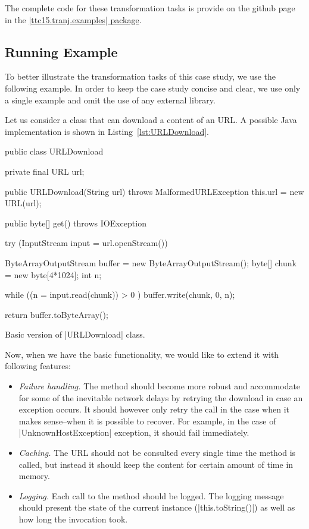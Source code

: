 The complete code for these transformation tasks is provide on the github page in the \href{https://github.com/fikovnik/ttc15-tranj-case/tree/master/src/ttc15-tranj/src/main/java/ttc15/tranj/examples}{\javainline|ttc15.tranj.examples| package}.

\subsection{Running Example}

To better illustrate the transformation tasks of this case study, we use the following example.
In order to keep the case study concise and clear, we use only a single example and omit the use of any external library.

Let us consider a class that can download a content of an URL.
A possible Java implementation is shown in Listing~\ref{lst:URLDownload}.

\begin{listing}[H]
  \begin{javacode}
  public class URLDownload {
    private final URL url;

    public URLDownload(String url) throws MalformedURLException {
      this.url = new URL(url);
    }

    public byte[] get() throws IOException {
      try (InputStream input = url.openStream()) {

        ByteArrayOutputStream buffer = new ByteArrayOutputStream();
        byte[] chunk = new byte[4*1024];
        int n;

        while ((n = input.read(chunk)) > 0 ) {
          buffer.write(chunk, 0, n);
        }

        return buffer.toByteArray();
      }
    }
  }
  \end{javacode}
  \caption{Basic version of \javainline|URLDownload| class.}
  \label{lst:URLDownload}
\end{listing}

Now, when we have the basic functionality, we would like to extend it with following features:

\begin{itemize}[--]
   \item \emph{Failure handling.} The method should become more robust and accommodate for some of the inevitable network delays by retrying the download in case an exception occurs.
   It should however only retry the call in the case when it makes sense--\Ie when it is possible to recover.
   For example, in the case of \javainline|UnknownHostException| exception, it should fail immediately.
   \item \emph{Caching.} The URL should not be consulted every single time the method is called, but instead it should keep the content for certain amount of time in memory.
   \item \emph{Logging.} Each call to the method should be logged.
   The logging message should present the state of the current instance (\javainline|this.toString()|) as well as how long the invocation took.
\end{itemize} 

